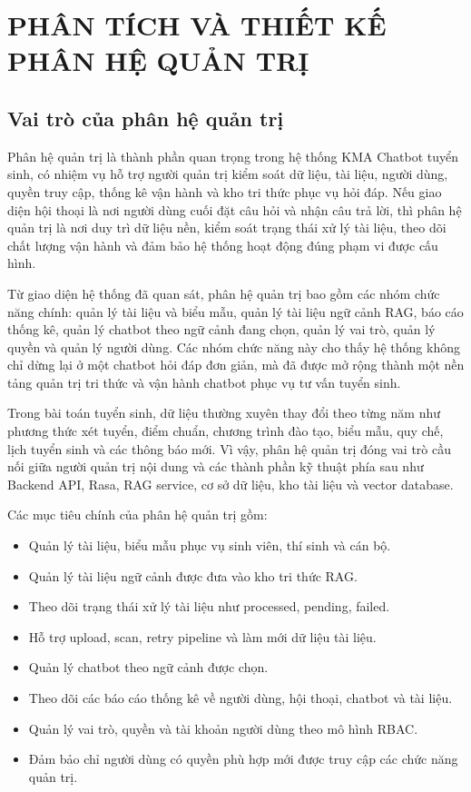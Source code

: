 ﻿\chapter{PHÂN TÍCH VÀ THIẾT KẾ PHÂN HỆ QUẢN TRỊ}

\section{Vai trò của phân hệ quản trị}

Phân hệ quản trị là thành phần quan trọng trong hệ thống KMA Chatbot tuyển sinh, có nhiệm vụ hỗ trợ người quản trị kiểm soát dữ liệu, tài liệu, người dùng, quyền truy cập, thống kê vận hành và kho tri thức phục vụ hỏi đáp. Nếu giao diện hội thoại là nơi người dùng cuối đặt câu hỏi và nhận câu trả lời, thì phân hệ quản trị là nơi duy trì dữ liệu nền, kiểm soát trạng thái xử lý tài liệu, theo dõi chất lượng vận hành và đảm bảo hệ thống hoạt động đúng phạm vi được cấu hình.

Từ giao diện hệ thống đã quan sát, phân hệ quản trị bao gồm các nhóm chức năng chính: quản lý tài liệu và biểu mẫu, quản lý tài liệu ngữ cảnh RAG, báo cáo thống kê, quản lý chatbot theo ngữ cảnh đang chọn, quản lý vai trò, quản lý quyền và quản lý người dùng. Các nhóm chức năng này cho thấy hệ thống không chỉ dừng lại ở một chatbot hỏi đáp đơn giản, mà đã được mở rộng thành một nền tảng quản trị tri thức và vận hành chatbot phục vụ tư vấn tuyển sinh.

Trong bài toán tuyển sinh, dữ liệu thường xuyên thay đổi theo từng năm như phương thức xét tuyển, điểm chuẩn, chương trình đào tạo, biểu mẫu, quy chế, lịch tuyển sinh và các thông báo mới. Vì vậy, phân hệ quản trị đóng vai trò cầu nối giữa người quản trị nội dung và các thành phần kỹ thuật phía sau như Backend API, Rasa, RAG service, cơ sở dữ liệu, kho tài liệu và vector database.

Các mục tiêu chính của phân hệ quản trị gồm:

\begin{itemize}
    \item Quản lý tài liệu, biểu mẫu phục vụ sinh viên, thí sinh và cán bộ.
    \item Quản lý tài liệu ngữ cảnh được đưa vào kho tri thức RAG.
    \item Theo dõi trạng thái xử lý tài liệu như processed, pending, failed.
    \item Hỗ trợ upload, scan, retry pipeline và làm mới dữ liệu tài liệu.
    \item Quản lý chatbot theo ngữ cảnh được chọn.
    \item Theo dõi các báo cáo thống kê về người dùng, hội thoại, chatbot và tài liệu.
    \item Quản lý vai trò, quyền và tài khoản người dùng theo mô hình RBAC.
    \item Đảm bảo chỉ người dùng có quyền phù hợp mới được truy cập các chức năng quản trị.
\end{itemize}


